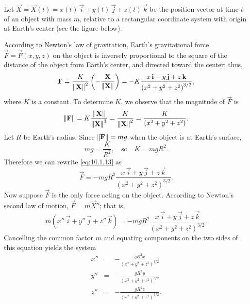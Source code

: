\documentclass{ximera}
\begin{document}
\begin{example}\label{example:10.1.3}
Let $\vec{X}=\vec{X}(t)=x(t)\,\vec{i}+y(t)\,\vec{j}+z(t)\,\vec{k}$ be
the position vector at time $t$ of an object with mass $m$, relative
to a rectangular coordinate system with origin at Earth's center
(see the figure below). 

\begin{center}
\end{center}


According to Newton's law of gravitation,
Earth's gravitational force $\vec{F}=\vec{F}(x,y,z)$ on the object is
inversely proportional to the square of the distance of the object
from Earth's center, and directed toward the center;   thus,
\begin{equation} \label{eq:10.1.13}
\mathbf{F}=\frac{K}{\left\lVert\mathbf{X}\right\rVert^2}\left(-\frac{\mathbf{X}}
{\left\lVert\mathbf{X}\right\rVert}\right)=-K\frac{x\,\mathbf{i}+y\,\mathbf{j}+z\,\mathbf{k}}{\left(x^2+y^2+z^2\right)^{3/2}},
\end{equation}
where $K$ is a constant.  To determine $K$,  we observe that the magnitude
of $\vec{F}$  is
$$
\left\lVert\mathbf{F}\right\rVert=K\frac{\left\lVert\mathbf{X}\right\rVert}{\left\lVert\mathbf{X}\right\rVert^3}=\frac{K}{\left\lVert\mathbf{X}\right\rVert^2}
=\frac{K}{(x^2+y^2+z^2)}.
$$
Let $R$  be Earth's radius.
Since $\left\lVert\mathbf{F}\right\rVert=mg$ when the object is at Earth's
surface,
$$
mg = \frac{K}{R^2},\quad\mbox{so}\quad K=mgR^2.
$$
Therefore we can rewrite \eqref{eq:10.1.13} as
$$
\vec{F}=-mgR^2\frac{x\,\vec{i}+y\,\vec{j}+z\,\vec{k}}{\left(x^2+y^2+z^2\right)^{3/2}}.
$$
Now suppose $\vec{F}$ is the only force acting on the object.
According to Newton's second law of motion, $\vec{F}=m\vec{X}''$;   that
is,
$$
 m(x''\,\vec{i}+y''\,\vec{j}+z''\,\vec{k})=
-mgR^2\frac{x\,\vec{i}+y\,\vec{j}+z\,\vec{k}}{\left(x^2+y^2+z^2\right)^{3/2}}.
$$
Cancelling the common factor $m$ and equating components on the two sides
of this equation yields the  system
\begin{equation} \label{eq:10.1.14}
\begin{array}{rcl}
 x''&=&-\frac{gR^2x}{(x^2+y^2+z^2)^{3/2}}\\
 y''&=&-\frac{gR^2y}{(x^2+y^2+z^2)^{3/2}}\\
 z''&=&-\frac{gR^2z}{(x^2+y^2+z^2)^{3/2}}.
\end{array}
\end{equation}
\end{example}
\end{document}
